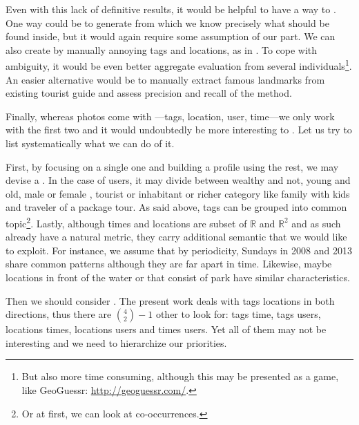 Even with this lack of definitive results, it would be helpful to have a way
to . One way could be to generate
 from which we know precisely what should be found
inside, but it would again require some assumption of our part. We can also
create  by manually annoying tags and
locations, as in \cite{Rattenbury2009}. To cope with ambiguity, it would be
even better aggregate evaluation from several individuals\footnote{But also
more time consuming, although this may be presented as a game, like GeoGuessr:
\url{http://geoguessr.com/}.}. An easier alternative would be to manually
extract famous landmarks from existing tourist guide and assess precision and
recall of the method.

\medskip

Finally, whereas photos come with ---tags, location, user, time---we only work with the first two
and it would undoubtedly be more interesting to .
Let us try to list systematically what we can do of it.

First, by focusing on a single one and building a profile using the rest, we
may devise a .
In the case of users, it may divide between wealthy and not, young and old,
male or female \cite{gender}, tourist or inhabitant or richer category like
family with kids and traveler of a package tour. As said above, tags can be
grouped into common topic\footnote{Or at first, we can look at
co-occurrences.}. Lastly, although times and locations are subset of
$\mathbb{R}$ and $\mathbb{R}^2$ and as such already have a natural metric,
they carry additional semantic that we would like to exploit. For instance, we
assume that by periodicity, Sundays in 2008 and 2013 share common patterns
although they are far apart in time. Likewise, maybe locations in front of the
water or that consist of park have similar characteristics.

Then we should consider . The present work deals
with tags \texrel locations in both directions, thus there are $\binom{4}{2} -
1$ other to look for: tags \texrel time, tags \texrel users, locations \texrel
times, locations \texrel users and times \texrel users. Yet all of them may
not be interesting and we need to hierarchize our priorities. 
